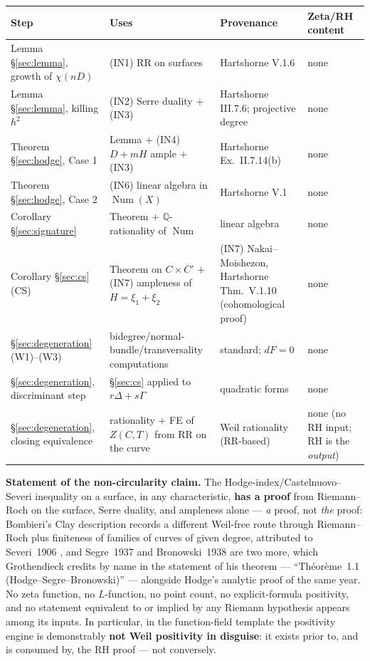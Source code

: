 \documentclass[11pt]{article}
\theoremstyle{definition}
\theoremstyle{remark}
\newcommand{\Num}{\operatorname{Num}}
\begin{document}
\begin{center}
\begin{tabular}{@{}>{\raggedright\arraybackslash}p{3.4cm}>{\raggedright\arraybackslash}p{4.3cm}>{\raggedright\arraybackslash}p{3.9cm}>{\raggedright\arraybackslash}p{2.5cm}@{}}
\toprule
\textbf{Step} & \textbf{Uses} & \textbf{Provenance} & \textbf{Zeta/RH content} \\
\midrule
Lemma \S\ref{sec:lemma}, growth of $\chi(nD)$ & (IN1) RR on surfaces &
  Hartshorne V.1.6 & none \\
Lemma \S\ref{sec:lemma}, killing $h^2$ & (IN2) Serre duality $+$ (IN3) &
  Hartshorne III.7.6; projective degree & none \\
Theorem \S\ref{sec:hodge}, Case 1 & Lemma $+$ (IN4) $D + mH$ ample $+$ (IN3) &
  Hartshorne Ex.~II.7.14(b) & none \\
Theorem \S\ref{sec:hodge}, Case 2 & (IN6) linear algebra in $\Num(X)$ &
  Hartshorne V.1 & none \\
Corollary \S\ref{sec:signature} & Theorem $+$ $\mathbb{Q}$-rationality of $\Num$ &
  linear algebra & none \\
Corollary \S\ref{sec:cs} (CS) & Theorem on $C \times C'$ $+$ (IN7) ampleness of
  $H = \xi_1 + \xi_2$ & (IN7) Nakai--Moishezon, Hartshorne Thm.~V.1.10 (cohomological
  proof) & none \\
\S\ref{sec:degeneration} (W1)--(W3) & bidegree/normal-bundle/transversality computations &
  standard; $dF = 0$ & none \\
\S\ref{sec:degeneration}, discriminant step & \S\ref{sec:cs} applied to
  $r\Delta + s\Gamma$ & quadratic forms & none \\
\S\ref{sec:degeneration}, closing equivalence & rationality $+$ FE of $Z(C, T)$ from RR on
  the curve & Weil rationality (RR-based) & none (no RH input; RH is the \emph{output}) \\
\bottomrule
\end{tabular}
\end{center}

\medskip

\noindent\textbf{Statement of the non-circularity claim.} The
Hodge-index/Castelnuovo--Severi inequality on a surface, in any characteristic, \textbf{has a
proof} from Riemann--Roch on the surface, Serre duality, and ampleness alone --- \emph{a}
proof, not \emph{the} proof: Bombieri's Clay description records a different Weil-free route
through Riemann--Roch plus finiteness of families of curves of given degree, attributed to
Severi~1906 \cite[p.~9]{BombieriRH}, and Segre~1937 and Bronowski~1938 are two more, which
Grothendieck credits by name in the statement of his theorem --- ``Th\'eor\`eme~1.1
(Hodge--Segre--Bronowski)'' \cite[p.~208]{Grothendieck} --- alongside Hodge's analytic proof of
the same year. No zeta function, no
$L$-function, no point count, no explicit-formula positivity, and no statement equivalent to
or implied by any Riemann hypothesis appears among its inputs. In particular, in the
function-field template the positivity engine is demonstrably \textbf{not Weil positivity in
disguise}: it exists prior to, and is consumed by, the RH proof --- not conversely.
\end{document}
